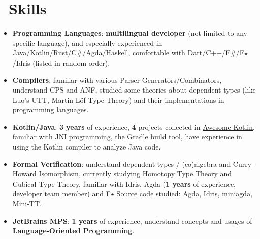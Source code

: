 \documentclass{resume}
\begin{document}


\section{\faCogs\ Skills}
\begin{itemize}[parsep=0.25ex]
  \item \textbf{Programming Languages}:
    \textbf{multilingual developer} (not limited to any specific language),
    and especially experienced in Java/Kotlin/Rust/C\#/Agda/Haskell,
    comfortable with Dart/C++/F\#/F$\star$/Idris (listed in random order).

  \item \textbf{Compilers}:
    familiar with various Parser Generators/Combinators,
    understand CPS and ANF, studied some
    theories about dependent types (like Luo's UTT, Martin-L\"{o}f Type Theory)
    and their implementations in programming languages.

  \item \textbf{Kotlin/Java}:
    \textbf{3 years} of experience,
    \textbf{4} projects collected in
    \href{https://kotlin.link/?q=ice} {Awesome Kotlin},
    familiar with JNI programming, the Gradle build tool, have experience
    in using the Kotlin compiler to analyze Java code.

  \item \textbf{Formal Verification}:
    understand dependent types / (co)algebra and Curry-Howard Isomorphism,
    currently studying Homotopy Type Theory and Cubical Type Theory,
    familiar with Idris, Agda (\textbf{1 years} of experience,
    developer team member) and F$\star$
    \subitem Source code studied: Agda, Idris, miniagda, Mini-TT.

  \item \textbf{JetBrains MPS}:
    \textbf{1 years} of experience,
    understand concepts and usages of \textbf{Language-Oriented Programming}.


\end{itemize}
\end{document}
